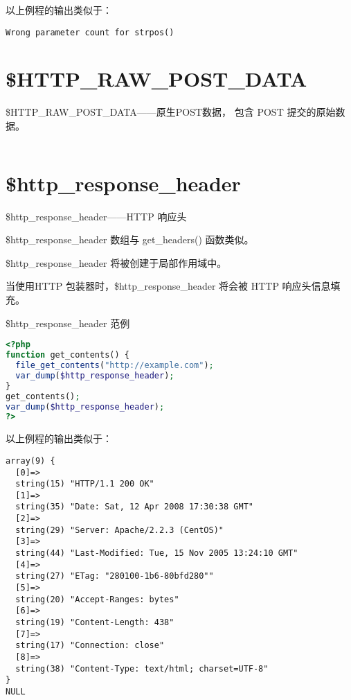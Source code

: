以上例程的输出类似于：

\begin{verbatim}
Wrong parameter count for strpos()
\end{verbatim}






\section{\$HTTP\_RAW\_POST\_DATA}


\$HTTP\_RAW\_POST\_DATA——原生POST数据， 包含 POST 提交的原始数据。

\begin{example}

\begin{lstlisting}[language=PHP]

\end{lstlisting}
\end{example}

\section{\$http\_response\_header}



\$http\_response\_header——HTTP 响应头

\begin{compactitem}
\item \$http\_response\_header 数组与 get\_headers() 函数类似。
\item \$http\_response\_header 将被创建于局部作用域中。
\end{compactitem}

当使用HTTP 包装器时，\$http\_response\_header 将会被 HTTP 响应头信息填充。



\begin{example}
\$http\_response\_header 范例
\begin{lstlisting}[language=PHP]
<?php
function get_contents() {
  file_get_contents("http://example.com");
  var_dump($http_response_header);
}
get_contents();
var_dump($http_response_header);
?>
\end{lstlisting}
\end{example}

以上例程的输出类似于：

\begin{verbatim}
array(9) {
  [0]=>
  string(15) "HTTP/1.1 200 OK"
  [1]=>
  string(35) "Date: Sat, 12 Apr 2008 17:30:38 GMT"
  [2]=>
  string(29) "Server: Apache/2.2.3 (CentOS)"
  [3]=>
  string(44) "Last-Modified: Tue, 15 Nov 2005 13:24:10 GMT"
  [4]=>
  string(27) "ETag: "280100-1b6-80bfd280""
  [5]=>
  string(20) "Accept-Ranges: bytes"
  [6]=>
  string(19) "Content-Length: 438"
  [7]=>
  string(17) "Connection: close"
  [8]=>
  string(38) "Content-Type: text/html; charset=UTF-8"
}
NULL
\end{verbatim}






